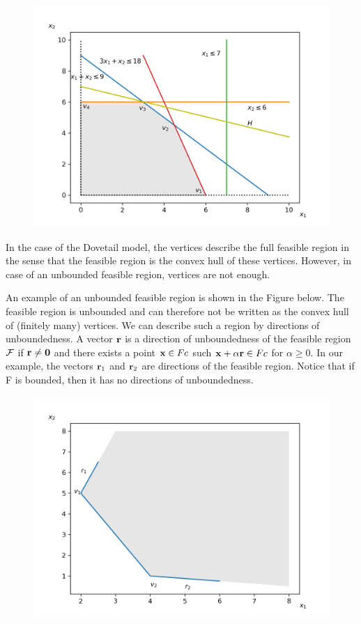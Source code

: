 \begin{figure}[H]
\includegraphics[scale = 0.7]{images/2022-09-27_lin_prog_1_02.png}
\end{figure}

In the case of the Dovetail model, the vertices describe the full feasible region in the sense that the feasible region is the convex hull of these vertices. However, in case of an unbounded feasible region, vertices are not enough.

An example of an unbounded feasible region is shown in the Figure below. The feasible region is unbounded and can therefore not be written as the convex hull of (finitely many) vertices. We can describe such a region by directions of unboundedness. A vector $\mathbf{r}$ is a direction of unboundedness of the feasible region $\mathcal{F}$ if $\mathbf{r} \neq \mathbf{0}$ and there exists a point $\mathbf{x} \in Fc$ such $\mathbf{x} + \alpha \mathbf{r} \in Fc$ for $\alpha \geq 0$. In our example, the vectors $\mathbf{r}_1$ and $\mathbf{r}_2$ are directions of the feasible region. Notice that if F is bounded, then it has no directions of unboundedness.

\begin{figure}[H]
\includegraphics[scale = 0.7]{images/2022-09-27_lin_prog_1_03.png}
\end{figure}

